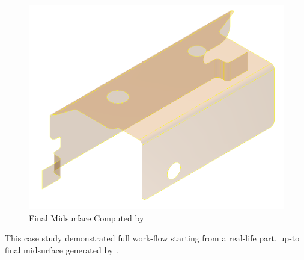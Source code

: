 
\begin{figure}[!h]
\centering     %
\includegraphics[width=0.62\linewidth,valign=t]{../Common/images/JBM_UBracket_midsurf_after_dormant_model}
\caption{Final Midsurface Computed by \mysystemname}
\label{fig:results:jbmfinal}
\end{figure}




%

This case study demonstrated full work-flow starting from a real-life part, up-to final midsurface generated by \mysystemname.


